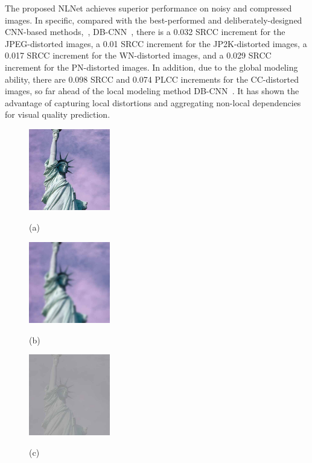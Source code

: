 	The proposed NLNet achieves superior performance on noisy and compressed images. In specific, compared with the best-performed and deliberately-designed CNN-based methods,~\eg, DB-CNN~\citep{zhang2018blind}, there is a 0.032 SRCC increment for the JPEG-distorted images, a 0.01 SRCC increment for the JP2K-distorted images, a 0.017 SRCC increment for the WN-distorted images, and a 0.029 SRCC increment for the PN-distorted images. In addition, due to the global modeling ability, there are 0.098 SRCC and 0.074 PLCC increments for the CC-distorted images, so far ahead of the local modeling method DB-CNN~\citep{zhang2018blind}. It has shown the advantage of capturing local distortions and aggregating non-local dependencies for visual quality prediction.
	\begin{figure}[!]
		\centering
		\begin{minipage}[t]{.24\linewidth}
			\includegraphics[width=1.4in]{CSIQ/lady_liberty.jpg}
			\centerline{(a)}
		\end{minipage}
		\begin{minipage}[t]{.24\linewidth}
			\includegraphics[width=1.4in]{CSIQ/lady_liberty.BLUR.4.jpg}
			\centerline{(b)}
		\end{minipage}
		\begin{minipage}[t]{.24\linewidth}
			\includegraphics[width=1.4in]{CSIQ/lady_liberty.contrast.3.jpg}
			\centerline{(c)}
		\end{minipage}

\end{figure}

